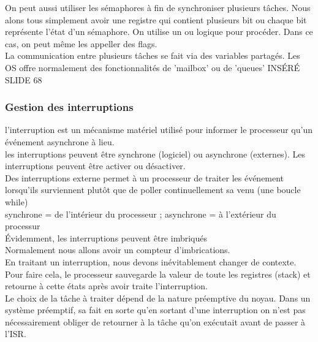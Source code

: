 \documentclass[oneside]{book}
\begin{document}
    On peut aussi utiliser les sémaphores à fin de synchroniser plusieurs tâches. Nous alons tous simplement avoir une registre qui contient plusieurs bit ou chaque bit représente l'état d'un sémaphore. On utilise un ou logique pour procéder. Dans ce cas, on peut même les appeller des flags.\\
    
    La communication entre plusieurs tâches se fait via des variables partagés. Les OS offre normalement des fonctionnalités de 'mailbox' ou de 'queues' INSÉRÉ SLIDE 68\\
    
    \subsubsection{Gestion des interruptions}
    l'interruption est un mécanisme matériel utilisé pour informer le processeur qu'un événement asynchrone à lieu.\\
    
    les interruptions peuvent être synchrone (logiciel) ou asynchrone (externes). Les interruptions peuvent être activer ou désactiver.\\
    
    Des interruptions externe permet à un processeur de traiter les événement lorsqu'ils surviennent plutôt que de poller continuellement sa venu (une boucle while)\\
    
    synchrone = de l'intérieur du processeur ; asynchrone = à l'extérieur du processur\\
    
    Évidemment, les interruptions peuvent être imbriqués\\
    
    Normalement nous allons avoir un compteur d'imbrications.\\
    
    En traitant un interruption, nous devons inévitablement changer de contexte. Pour faire cela, le processeur sauvegarde la valeur de toute les registres (stack) et retourne à cette états après avoir traite l'interruption.\\
    
    Le choix de la tâche à traiter dépend de la nature préemptive du noyau. Dans un système préemptif, sa fait en sorte qu'en sortant d'une interruption on n'est pas nécessairement obliger de retourner à la tâche qu'on exécutait avant de passer à l'ISR.\\
    
\end{document}

